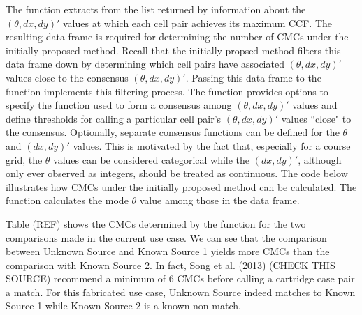 The  function extracts from the list returned by  information about the $(\theta,dx,dy)'$ values at which each cell pair achieves its maximum CCF. The resulting data frame is required for determining the number of CMCs under the initially proposed method. Recall that the initially propsed method filters this data frame down by determining which cell pairs have associated $(\theta,dx,dy)'$ values close to the consensus $(\theta,dx,dy)'$. Passing this data frame to the  function implements this filtering process. The  function provides options to specify the function used to form a consensus among $(\theta,dx,dy)'$ values and define thresholds for calling a particular cell pair's $(\theta,dx,dy)'$ values ``close" to the consensus. Optionally, separate consensus functions can be defined for the $\theta$ and $(dx,dy)'$ values. This is motivated by the fact that, especially for a course grid, the $\theta$ values can be considered categorical while the $(dx,dy)'$, although only ever observed as integers, should be treated as continuous. The code below illustrates how CMCs under the initially proposed method can be calculated. The  function calculates the mode $\theta$ value among those in the  data frame.


Table (REF) shows the CMCs determined by the  function for the two comparisons made in the current use case. We can see that the comparison between Unknown Source and Known Source 1 yields more CMCs than the comparison with Known Source 2. In fact, Song et al. (2013) (CHECK THIS SOURCE) recommend a minimum of 6 CMCs before calling a cartridge case pair a match. For this fabricated use case, Unknown Source indeed matches to Known Source 1 while Known Source 2 is a known non-match.

